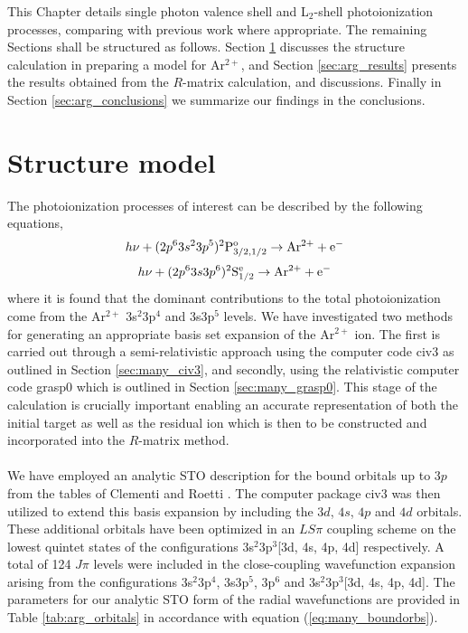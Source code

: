 This Chapter details single photon valence shell and L$_{2}$-shell photoionization processes, comparing with previous work where appropriate. The remaining Sections shall be structured as follows. Section \ref{sec:arg_structure} discusses the structure calculation in preparing a model for Ar$^{2+}$, and Section \ref{sec:arg_results} presents the results obtained from the $R$-matrix calculation, and discussions. Finally in Section \ref{sec:arg_conclusions} we summarize our findings in the conclusions.



\section{Structure model}\label{sec:arg_structure}
The photoionization processes of interest can be described by the following equations,
\begin{equation}\label{eq:arg_photo1}
h\nu + (2p^63s^23p^5) ^2\rm{P}^{o}_{3/2, 1/2} \rightarrow Ar^{2+} + \rm{e}^-
\end{equation}
\begin{equation}\label{eq:arg_photo2}
h\nu + (2p^63s3p^6) ^2\rm{S}^{e}_{1/2} \rightarrow Ar^{2+} + \rm{e}^-
\end{equation}
where it is found that the dominant contributions to the total photoionization come from the Ar$^{2+}$ 3s$^2$3p$^4$ and 3s3p$^5$ levels. We have investigated two methods for generating an appropriate basis set expansion of the Ar$^{2+}$ ion. The first is carried out through a semi-relativistic approach using the computer code {\sc civ3} \citep{1975CoPhC...9..141H} as outlined in Section \ref{sec:many_civ3}, and secondly, using the relativistic computer code {\sc grasp0} \citep{1996CoPhC..94..249P} which is outlined in Section \ref{sec:many_grasp0}. This stage of the calculation is crucially important enabling an accurate representation of both the initial target as well as the residual ion which is then to be constructed and incorporated into the $R$-matrix method.\\ 

\\
We have employed an analytic STO description for the bound orbitals up to $3p$ from the tables of Clementi and Roetti \citep{1974ADNDT..14..177C}. The computer package {\sc civ3} was then utilized to extend this basis expansion by including the $3d$, $4s$, $4p$ and $4d$ orbitals. These additional orbitals have been optimized in an $LS\pi$ coupling scheme on the lowest quintet states of the configurations 3s$^2$3p$^3$[3d, 4s, 4p, 4d] respectively. A total of 124 $J\pi$ levels were included in the close-coupling wavefunction expansion arising from the configurations 3s$^2$3p$^4$, 3s3p$^5$, 3p$^6$ and 3s$^2$3p$^3$[3d, 4s, 4p, 4d]. The parameters for our analytic STO form of the radial wavefunctions are provided in Table \ref{tab:arg_orbitals} in accordance with equation (\ref{eq:many_boundorbs}).

